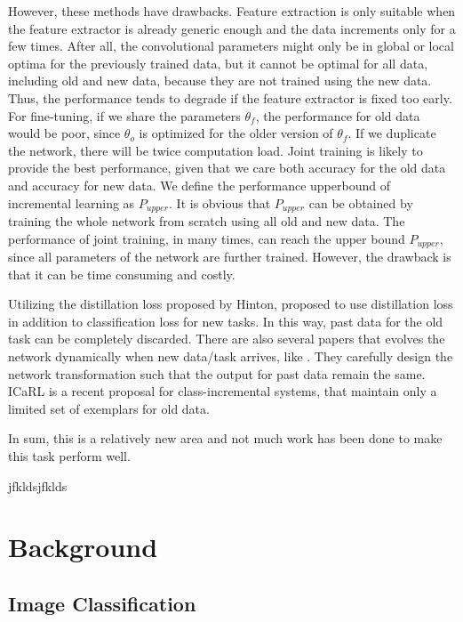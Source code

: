 However, these methods have drawbacks. Feature extraction is only suitable when the feature extractor is already generic enough and the data increments only for a few times. After all, the convolutional parameters might only be in global or local optima for the previously trained data, but it cannot be optimal for all data, including old and new data, because they are not trained using the new data. Thus, the performance tends to degrade if the feature extractor is fixed too early. For fine-tuning, if we share the parameters $\theta_f$, the performance for old data would be poor, since $\theta_o$ is optimized for the older version of $\theta_f$. If we duplicate the network, there will be twice computation load. Joint training is likely to provide the best performance, given that we care both accuracy for the old data and accuracy for new data. We define the performance upperbound of incremental learning as $P_{upper}$. It is obvious that $P_{upper}$ can be obtained by training the whole network from scratch using all old and new data. The performance of joint training, in many times, can reach the upper bound $P_{upper}$, since all parameters of the network are further trained. However, the drawback is that it can be time consuming and costly.

Utilizing the distillation loss proposed by Hinton\cite{hinton2015distilling}, \cite{li2017learning} proposed to use distillation loss in addition to classification loss for new tasks. In this way, past data for the old task can be completely discarded. There are also several papers that evolves the network dynamically when new data/task arrives, like \cite{yoon2017lifelong,rosenfeld2017incremental,sarwar2017incremental,rusu2016progressive}. They carefully design the network transformation such that the output for past data remain the same. ICaRL\cite{rebuffi2017icarl} is a recent proposal for class-incremental systems, that maintain only a limited set of exemplars for old data.

In sum, this is a relatively new area and not much work has been done to make this task perform well.





\parencite{Meta_CN}jfkldsjfklds
\chapter{Background}

\section{Image Classification}
